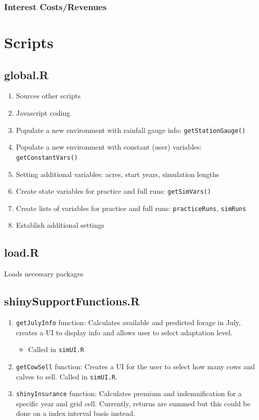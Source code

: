 \documentclass[11pt]{article}
\begin{document}
\subsubsection{Interest Costs/Revenues}



\newpage

\section{Scripts}

\subsection{global.R}
\begin{enumerate}
\item Sources other scripts
\item Javascript coding
\item Populate a new environment with rainfall gauge info: \verb!getStationGauge()!
\item Populate a new environment with constant (user) variables: \verb!getConstantVars()!
\item Setting additional variables: acres, start years, simulation lengths
\item Create state variables for practice and full runs: \verb!getSimVars()!
\item Create lists of variables for practice and full runs: \verb!practiceRuns!, \verb!simRuns!
\item Establish additional settings
\end{enumerate}  
 
\subsection{load.R}
Loads necessary packages

\subsection{shinySupportFunctions.R}
\begin{enumerate}
\item \verb!getJulyInfo! function: Calculates available and predicted forage in July, creates a
    UI to display info and allows user to select adaptation level.
    \begin{itemize}
    \item Called in \verb!simUI.R!
    \end{itemize}
\item \verb!getCowSell! function: Creates a UI for the user to select how many cows and calves to sell. Called in \verb!simUI.R!.
\item \verb!shinyInsurance! function: Calculates premium and indemnification for a specific year and grid cell. Currently, returns are summed but this could be done on a index interval basis instead.
\end{enumerate}
\end{document}
